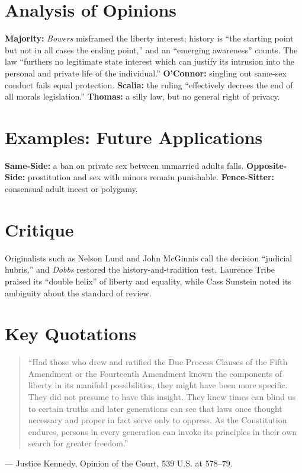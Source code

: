 \documentclass[12pt]{article}
\begin{document}
\section{Analysis of Opinions}
\textbf{Majority:} \textit{Bowers} misframed the liberty interest; history is ``the starting point but not in all cases the ending point,'' and an ``emerging awareness'' counts. The law ``furthers no legitimate state interest which can justify its intrusion into the personal and private life of the individual.'' \textbf{O'Connor:} singling out same-sex conduct fails equal protection. \textbf{Scalia:} the ruling ``effectively decrees the end of all morals legislation.'' \textbf{Thomas:} a silly law, but no general right of privacy.

\section{Examples: Future Applications}
\textbf{Same-Side:} a ban on private sex between unmarried adults falls. \textbf{Opposite-Side:} prostitution and sex with minors remain punishable. \textbf{Fence-Sitter:} consensual adult incest or polygamy.

\section{Critique}
Originalists such as Nelson Lund and John McGinnis call the decision ``judicial hubris,'' and \textit{Dobbs} restored the history-and-tradition test. Laurence Tribe praised its ``double helix'' of liberty and equality, while Cass Sunstein noted its ambiguity about the standard of review.

\section{Key Quotations}
\begin{quote}
``Had those who drew and ratified the Due Process Clauses of the Fifth Amendment or the Fourteenth Amendment known the components of liberty in its manifold possibilities, they might have been more specific. They did not presume to have this insight. They knew times can blind us to certain truths and later generations can see that laws once thought necessary and proper in fact serve only to oppress. As the Constitution endures, persons in every generation can invoke its principles in their own search for greater freedom.''
\end{quote}
\noindent --- Justice Kennedy, Opinion of the Court, 539 U.S. at 578--79.
\end{document}
